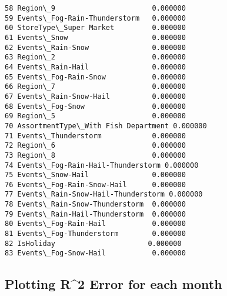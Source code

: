 \documentclass[11pt]{article}
\begin{document}
\begin{Verbatim}[commandchars=\\\{\}]
58 Region\_9                       0.000000
59 Events\_Fog-Rain-Thunderstorm   0.000000
60 StoreType\_Super Market         0.000000
61 Events\_Snow                    0.000000
62 Events\_Rain-Snow               0.000000
63 Region\_2                       0.000000
64 Events\_Rain-Hail               0.000000
65 Events\_Fog-Rain-Snow           0.000000
66 Region\_7                       0.000000
67 Events\_Rain-Snow-Hail          0.000000
68 Events\_Fog-Snow                0.000000
69 Region\_5                       0.000000
70 AssortmentType\_With Fish Department 0.000000
71 Events\_Thunderstorm            0.000000
72 Region\_6                       0.000000
73 Region\_8                       0.000000
74 Events\_Fog-Rain-Hail-Thunderstorm 0.000000
75 Events\_Snow-Hail               0.000000
76 Events\_Fog-Rain-Snow-Hail      0.000000
77 Events\_Rain-Snow-Hail-Thunderstorm 0.000000
78 Events\_Rain-Snow-Thunderstorm  0.000000
79 Events\_Rain-Hail-Thunderstorm  0.000000
80 Events\_Fog-Rain-Hail           0.000000
81 Events\_Fog-Thunderstorm        0.000000
82 IsHoliday                      0.000000
83 Events\_Fog-Snow-Hail           0.000000

    \end{Verbatim}

    \subsection{Plotting R\^{}2 Error for each
month}\label{plotting-r2-error-for-each-month}
\end{document}
